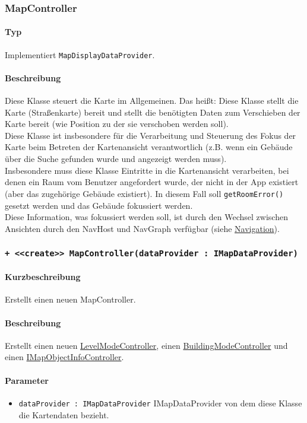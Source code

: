\subsubsection{MapController}\label{App_Map_ViewModel_MapController}
\paragraph*{Typ}
Implementiert \texttt{MapDisplayDataProvider}.
\paragraph*{Beschreibung}
Diese Klasse steuert die Karte im Allgemeinen. Das heißt: Diese Klasse stellt die Karte (Straßenkarte) bereit 
und stellt die benötigten Daten zum Verschieben der Karte bereit (wie Position zu der sie verschoben werden soll).\\
Diese Klasse ist insbesondere für die Verarbeitung und Steuerung des Fokus der Karte beim Betreten der 
Kartenansicht verantwortlich (z.B. wenn ein Gebäude über die Suche gefunden wurde und angezeigt werden muss).\\
Insbesondere muss diese Klasse Eintritte in die Kartenansicht verarbeiten, bei denen ein Raum vom Benutzer angefordert wurde, 
der nicht in der App existiert (aber das zugehörige Gebäude existiert). In diesem Fall soll \texttt{getRoomError()} gesetzt 
werden und das Gebäude fokussiert werden.\\
Diese Information, was fokussiert werden soll, ist durch den Wechsel zwischen Ansichten durch den NavHost und NavGraph verfügbar (siehe \hyperref[App_Navigation]{Navigation}).

\subsubsection*{\texttt{+ <<create>> MapController(dataProvider : IMapDataProvider)}}\label{App_Map_ViewModel_createMapController}%
\paragraph*{Kurzbeschreibung}
Erstellt einen neuen MapController.
\paragraph*{Beschreibung}
Erstellt einen neuen \hyperref[App_Map_ViewModel_LevelModeController]{LevelModeController}, einen \hyperref[App_Map_ViewModel_BuildingModeController]{BuildingModeController} und einen \hyperref[App_Map_ViewModel_IMapObjectInfoController]{IMapObjectInfoController}.
\paragraph*{Parameter}
\begin{itemize}
    \item \texttt{dataProvider : IMapDataProvider} IMapDataProvider von dem diese Klasse die Kartendaten bezieht.
\end{itemize}
